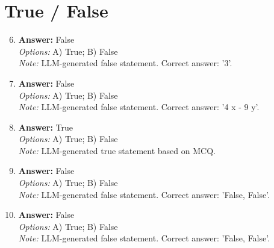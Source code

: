 \documentclass[12pt]{article}
\begin{document}
\section*{True / False}
\begin{enumerate}[label=\arabic*.]
\setcounter{enumi}{5}
\item \textbf{Answer:} False
\\ \textit{Options:} A) True; B) False
\\ \textit{Note:} LLM-generated false statement. Correct answer: '3'.
\item \textbf{Answer:} False
\\ \textit{Options:} A) True; B) False
\\ \textit{Note:} LLM-generated false statement. Correct answer: '4 x - 9 y'.
\item \textbf{Answer:} True
\\ \textit{Options:} A) True; B) False
\\ \textit{Note:} LLM-generated true statement based on MCQ.
\item \textbf{Answer:} False
\\ \textit{Options:} A) True; B) False
\\ \textit{Note:} LLM-generated false statement. Correct answer: 'False, False'.
\item \textbf{Answer:} False
\\ \textit{Options:} A) True; B) False
\\ \textit{Note:} LLM-generated false statement. Correct answer: 'False, False'.
\end{enumerate}
\end{document}
